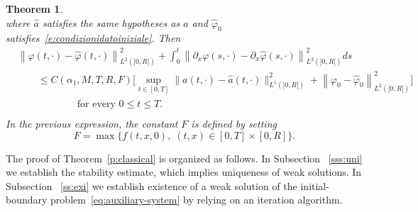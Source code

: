 \documentclass[11pt,leqno]{amsart}
\newtheorem{theorem}{Theorem}[section]
\numberwithin{equation}{section}
\begin{document}
\begin{theorem}
\begin{equation}
\end{equation} where $\hat a$ satisfies the same hypotheses as $a$ and $\hat {\varphi}_0$
satisfies~\eqref{e:condizionidatoiniziale}. 
Then
    \begin{equation}
    \label{eq:th2.3}
    \begin{split}
            & {\left\|{{\varphi}(t,\cdot)-  
            \widehat{\varphi}(t,\cdot)}\right\|}^2_{L^2(]0,R[)}+  
             \int_0^t  {\left\|{ \partial_x {\varphi}(s,\cdot) -  
             \partial_x \widehat{\varphi}(s,\cdot)}\right\|}^2_{L^2(]0,R[)}ds\\
    & \qquad \le 
    C(\alpha_1, M, T, R, F) 
    \Bigg[  \sup_{t \in [0, T]}
    \| a(t, \cdot)  - \hat a (t, \cdot)  \|^2_{L^1 (]0, R[)} + 
     {\left\|{{\varphi}_0-\widehat{\varphi}_0}\right\|}^2_{L^2(]0,R[)}  
     \Bigg]
     \\
    &  \qquad \qquad \qquad 
    \text{for every $0\le t\le T$.} \phantom{\int} \\
\end{split}
  \end{equation} 
  In the previous expression, the constant $F$ is defined by setting  
\begin{equation}
\label{e:finty}
   F =
    \max \Big\{ f(t, x, 0), \; (t, x) \in [0, T] \times [0, R] \Big\}. 
\end{equation}
\end{theorem}
The proof of Theorem~\ref{p:classical} is organized as follows. In Subsection ~\ref{sss:uni} we establish the 
stability estimate, which implies uniqueness of weak solutions. In Subsection ~\ref{ss:exi} we establish existence of a weak solution of the initial-boundary problem~\eqref{eq:auxiliary-system} by relying on an iteration algorithm. 
\end{document}
